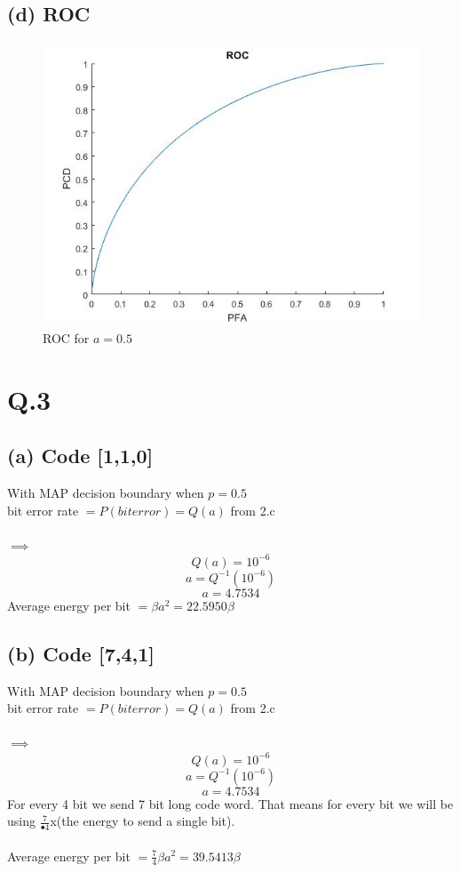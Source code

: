 \documentclass[a4paper,11pt]{article}
\begin{document}
 \subsection*{(d) ROC}
 \begin{figure}[h]
   \hspace*{-1cm}
    \includegraphics[scale=0.5]{q2_d_1}
    \caption{ROC for $a=0.5$}\label{fig:q2_d_1}
\end{figure}
\clearpage
\newpage
\section*{Q.3}
\subsection*{(a) Code [1,1,0]}
With MAP decision boundary when $p = 0.5$ \\
bit error rate  $= P(biterror) =Q(a)$ from 2.c\\\\
$\implies$\\
$$Q(a) = 10^{-6}$$
$$a = Q^{-1}(10^{-6})$$
$$a =4.7534$$
Average energy per bit $= \beta a^2=22.5950\beta$
\subsection*{(b) Code [7,4,1]}
With MAP decision boundary when $p = 0.5$ \\
bit error rate  $= P(biterror) =Q(a)$ from 2.c\\\\
$\implies$\\
$$Q(a) = 10^{-6}$$
$$a = Q^{-1}(10^{-6})$$
$$a =4.7534$$
For every 4 bit we send 7 bit long code word. That means for every bit we will be using
$\frac{7}{•4}$x(the energy to send a single bit).\\\\
Average energy per bit $= \frac{7}{4}\beta a^2=39.5413\beta$
\end{document}

